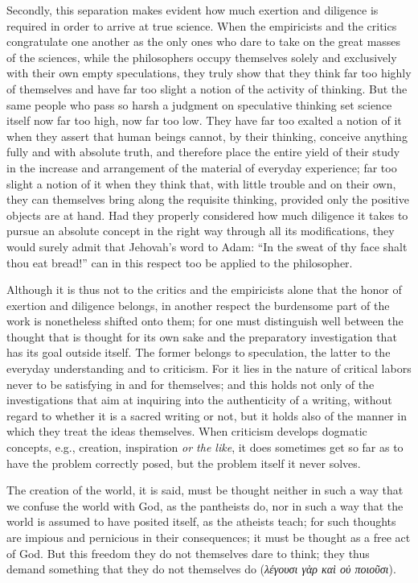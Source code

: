 \documentclass[12pt]{book}
\newcommand{\opage}[1]{\marginnote{\footnotesize\textit{[#1]}}}
\begin{document}
Secondly, this separation makes evident how much exertion and diligence is
required in order to arrive at true science. When the empiricists and the
critics congratulate one another as the only ones who dare to take on the great
masses of the sciences, while the philosophers occupy themselves solely and
exclusively with their own empty speculations, they truly show that they think
far too highly of themselves and have far too slight a notion of the activity
of thinking. But the same people who pass so harsh a judgment on speculative
thinking set science itself now far too high, now far too low. They have far
too exalted a notion of it when they assert that human beings cannot, by their
thinking, conceive anything fully and with absolute truth, and therefore place
the entire yield of their study in the increase and arrangement of the material
of everyday experience; far too slight a notion of it when they think that,
with little trouble and on their own, they can themselves bring along the
requisite thinking, provided only the positive objects are at hand. Had they
properly considered how much diligence it takes to pursue an absolute concept
in the right way through all its modifications, they would surely admit that
Jehovah's word to Adam: ``In the sweat of thy face shalt thou eat bread!'' can
in this respect too be applied to the philosopher.

Although it is thus not to the critics and the empiricists alone that the
honor of exertion and diligence belongs, in another respect the burdensome part
of the work is nonetheless shifted onto them; for one must distinguish well
between the thought that is thought for its own sake and the preparatory
investigation that has its goal outside itself. The former belongs to
speculation,
\opage{35} the latter to the everyday understanding and to criticism. For it
lies in the nature of critical labors never to be satisfying in and for
themselves; and this holds not only of the investigations that aim at inquiring
into the authenticity of a writing, without regard to whether it is a sacred
writing or not, but it holds also of the manner in which they treat the ideas
themselves. When criticism develops dogmatic concepts, e.g., creation,
inspiration \textit{or the like}, it does sometimes get so far as to have the
problem correctly posed, but the problem itself it never solves.

The creation of the world, it is said, must be thought neither in such a way
that we confuse the world with God, as the pantheists do, nor in such a way
that the world is assumed to have posited itself, as the atheists teach; for
such thoughts are impious and pernicious in their consequences; it must be
thought as a free act of God. But this freedom they do not themselves dare to
think; they thus demand something that they do not themselves do
(\textit{λέγουσι γὰρ καὶ οὐ ποιοῦσι}).
\end{document}
